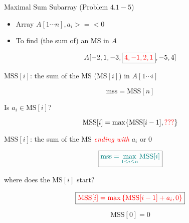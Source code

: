 
\begin{frame}{}
  \begin{exampleblock}{Maximal Sum Subarray (Problem $4.1-5$)}
    \begin{itemize}
      \item Array $A[1 \cdots n], a_{i} >=< 0$
      \item To find (the sum of) an MS in $A$
    \end{itemize}
	
    \[
      A[-2,1 ,-3, \boxed{\textcolor{red}{4,-1,2,1}} ,-5,4]
    \]
  \end{exampleblock}
\end{frame}

\begin{frame}{}
  \centerline{$\text{MSS}[i]$: the sum of the MS ($\text{MS}[i]$) in $A[1 \cdots i]$}

  \pause
  \vspace{0.30cm}
  \[
    \text{mss} = \text{MSS}[n]
  \]

  \pause
  \vspace{0.60cm}
  \centerline{ Is $a_{i} \in \text{MS}[i]$?}
  
  \pause
  \vspace{0.30cm}
  \[ 
    \text{MSS}[i] = \max \{\text{MSS}[i-1], \textcolor{red}{???}\}
  \]
\end{frame}

\begin{frame}{}
  \centerline{$\text{MSS}[i]$: the sum of the MS \textcolor{red}{\it ending with} $a_{i}$ or 0}

  \pause
  \vspace{0.30cm}
  \[
    \boxed{\textcolor{teal}{\text{mss} = \max\limits_{1 \le i \le n} \text{MSS}[i]}}
  \]

  \vspace{0.60cm}
  \centerline{ where does the $\text{MS}[i]$ start?}

  \pause
  \vspace{0.30cm}
  \[ 
    \boxed{\textcolor{red}{\text{MSS}[i] = \max \left\{\text{MSS}[i-1] + a_{i}, 0\right\}}}
  \]

  \pause
  \vspace{0.30cm}
  \[
    \text{MSS}[0] = 0
  \]

\end{frame}


